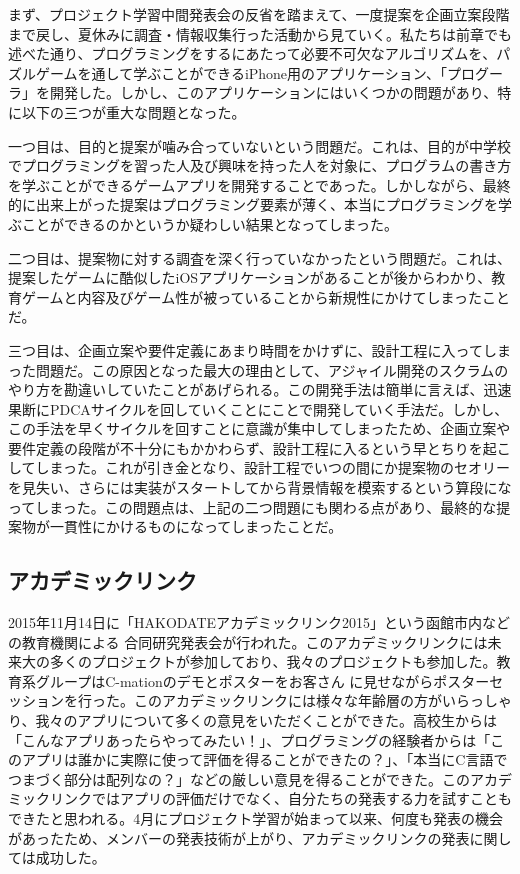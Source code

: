 \documentclass[openany,11pt,papersize]{jsbook}
\begin{document}
まず、プロジェクト学習中間発表会の反省を踏まえて、一度提案を企画立案段階まで戻し、夏休みに調査・情報収集行った活動から見ていく。私たちは前章でも述べた通り、プログラミングをするにあたって必要不可欠なアルゴリズムを、パズルゲームを通して学ぶことができるiPhone用のアプリケーション、「プログーラ」を開発した。しかし、このアプリケーションにはいくつかの問題があり、特に以下の三つが重大な問題となった。

一つ目は、目的と提案が噛み合っていないという問題だ。これは、目的が中学校でプログラミングを習った人及び興味を持った人を対象に、プログラムの書き方を学ぶことができるゲームアプリを開発することであった。しかしながら、最終的に出来上がった提案はプログラミング要素が薄く、本当にプログラミングを学ぶことができるのかというか疑わしい結果となってしまった。

二つ目は、提案物に対する調査を深く行っていなかったという問題だ。これは、提案したゲームに酷似したiOSアプリケーションがあることが後からわかり、教育ゲームと内容及びゲーム性が被っていることから新規性にかけてしまったことだ。

三つ目は、企画立案や要件定義にあまり時間をかけずに、設計工程に入ってしまった問題だ。この原因となった最大の理由として、アジャイル開発のスクラムのやり方を勘違いしていたことがあげられる。この開発手法は簡単に言えば、迅速果断にPDCAサイクルを回していくことにことで開発していく手法だ。しかし、この手法を早くサイクルを回すことに意識が集中してしまったため、企画立案や要件定義の段階が不十分にもかかわらず、設計工程に入るという早とちりを起こしてしまった。これが引き金となり、設計工程でいつの間にか提案物のセオリーを見失い、さらには実装がスタートしてから背景情報を模索するという算段になってしまった。この問題点は、上記の二つ問題にも関わる点があり、最終的な提案物が一貫性にかけるものになってしまったことだ。

\subsection{アカデミックリンク}
2015年11月14日に「HAKODATEアカデミックリンク2015」という函館市内などの教育機関による
合同研究発表会が行われた。このアカデミックリンクには未来大の多くのプロジェクトが参加しており、我々のプロジェクトも参加した。教育系グループはC-mationのデモとポスターをお客さん
に見せながらポスターセッションを行った。このアカデミックリンクには様々な年齢層の方がいらっしゃり、我々のアプリについて多くの意見をいただくことができた。高校生からは「こんなアプリあったらやってみたい！」、プログラミングの経験者からは「このアプリは誰かに実際に使って評価を得ることができたの？」、「本当にC言語でつまづく部分は配列なの？」などの厳しい意見を得ることができた。このアカデミックリンクではアプリの評価だけでなく、自分たちの発表する力を試すこともできたと思われる。4月にプロジェクト学習が始まって以来、何度も発表の機会があったため、メンバーの発表技術が上がり、アカデミックリンクの発表に関しては成功した。
\end{document}
